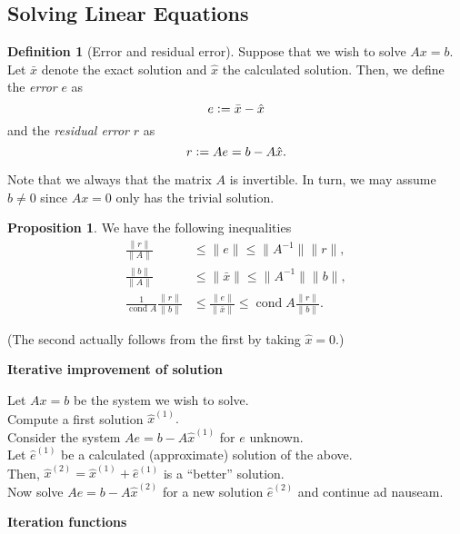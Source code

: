 \documentclass[12pt]{article}
\theoremstyle{definition}
\newtheorem{prop}[thm]{Proposition}
\newtheorem{defn}[thm]{Definition}
\DeclareMathOperator{\cond}{cond}
\begin{document}
\subsection{Solving Linear Equations}
\begin{defn}[Error and residual error]
	Suppose that we wish to solve $Ax = b.$ Let $\bar{x}$ denote the exact solution and $\hat{x}$ the calculated solution. Then, we define the \emph{error} $e$ as 
	\begin{equation*} 
		e \vcentcolon= \bar{x} - \hat{x}
	\end{equation*}
	and the \emph{residual error} $r$ as
	\begin{equation*} 
		r \vcentcolon= Ae = b - A\hat{x}.
	\end{equation*}
\end{defn}
Note that we always that the matrix $A$ is invertible. In turn, we may assume $b \neq 0$ since $Ax = 0$ only has the trivial solution.

\begin{prop}
	We have the following inequalities
	\begin{align*} 
		\frac{\|r\|}{\|A\|} &\le \|e\| \le \|A^{-1}\|\|r\|,\\
		\frac{\|b\|}{\|A\|} &\le \|\bar{x}\| \le \|A^{-1}\|\|b\|,\\
		\frac{1}{\cond A}\frac{\|r\|}{\|b\|} &\le \frac{\|e\|}{\|\bar{x}\|} \le \cond A \frac{\|r\|}{\|b\|}.
	\end{align*}
\end{prop}
(The second actually follows from the first by taking $\hat{x} = 0.$)

\textbf{Iterative improvement of solution}

Let $Ax = b$ be the system we wish to solve.\\
Compute a first solution $\hat{x}^{(1)}.$\\
Consider the system $Ae = b - A\hat{x}^{(1)}$ for $e$ unknown.\\
Let $\hat{e}^{(1)}$ be a calculated (approximate) solution of the above.\\
Then, $\hat{x}^{(2)} = \hat{x}^{(1)} + \hat{e}^{(1)}$ is a ``better'' solution.\\
Now solve $Ae = b - A\hat{x}^{(2)}$ for a new solution $\hat{e}^{(2)}$ and continue ad nauseam.

\textbf{Iteration functions}
\end{document}
